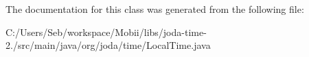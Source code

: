 The documentation for this class was generated from the following file\-:\begin{DoxyCompactItemize}
\item 
C\-:/\-Users/\-Seb/workspace/\-Mobii/libs/joda-\/time-\/2./src/main/java/org/joda/time/Local\-Time.\-java\end{DoxyCompactItemize}

